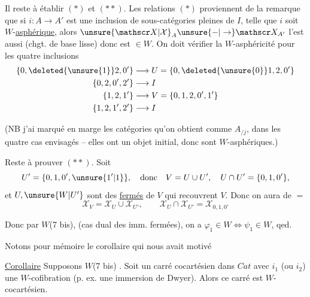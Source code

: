 Il reste à établir $(*)$ et $(**)$. Les relations $(*)$ proviennent de la remarque que si $i:A\longrightarrow A'$ est une inclusion de sous-catégories pleines de $I$, telle que $i$ soit $W$-\uline{asphérique},  alors $\unsure{\mathscr X|\mathcal X}_A\unsure{-|\to}\mathscr X_{A'}$ l'est aussi (chgt. de base lisse) donc est $\in W$. On doit vérifier la $W$-asphéricité pour les quatre inclusions
\[
 \begin{aligned}
 \{0,\deleted{\unsure{1}}2,0'\}&\longrightarrow U=\{0,\deleted{\unsure{0}}1,2,0'\}\\
 \{0,2,0',2'\}&\longrightarrow I\\
 \{1,2,1'\}&\longrightarrow V=\{0,1,2,0',1'\}\\
 \{1,2,1',2'\}&\longrightarrow I
 \end{aligned}
\]

(NB j'ai marqué en marge les catégories qu'on obtient comme $A_{/j}$,  dans les quatre cas envisagés -- elles ont  un objet initial, donc sont $W$-asphériques.)

Reste à prouver $(**)$. Soit
\[
 U'=\{0,1,0',\unsure{1'|1}\},\quad\text{donc}\quad
 V=U\cup U',\quad U\cap U'=\{0,1,0'\},
\]
 et $U,\unsure{W|U'}$ sont des \uline{fermés} de $V$ qui recouvrent $V$. Donc on aura de $=$
\[
 \mathscr X_V=\mathscr X_U\cup\mathscr X_{U'},\qquad
 \mathscr X_U\cap\mathscr X_{U'}=\mathscr X_{0,1,0'}
\]

Donc par $W$(7 bis), (cas dual  des imm. fermées), on a $\varphi_1\in W\Longleftrightarrow\psi_1\in W$, qed.

Notons pour mémoire le corollaire qui nous avait motivé

\uline{Corollaire} Supposons $W$(7 bis) . Soit un carré cocartésien dans $Cat$
avec $i_1$ (ou $i_2$) une $W$-cofibration (p. ex. une immersion de Dwyer). Alors ce carré est $W$-cocartésien.

